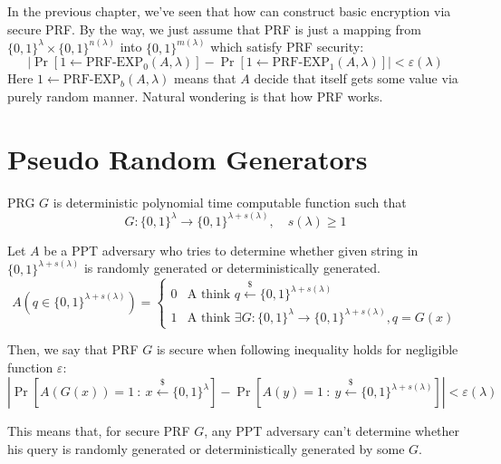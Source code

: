 \documentclass[12pt, a4paper, openany, twoside]{book}
\theoremstyle{definition}
\theoremstyle{remark}
\theoremstyle{plain}
\numberwithin{equation}{section}
\begin{document}
In the previous chapter, we've seen that how can construct basic encryption via secure PRF. 
By the way, we just assume that PRF is just a mapping from $\{0,1\}^\lambda \times \{0,1\}^{n(\lambda)}$ 
into $\{0,1\}^{m(\lambda)}$ which satisfy PRF security: 
\[\left|\Pr[1 \gets \text{PRF-EXP}_0(A, \lambda)] - \Pr[1 \gets \text{PRF-EXP}_1(A, \lambda)]\right| < \varepsilon(\lambda)\]
Here $1 \gets \text{PRF-EXP}_b(A, \lambda)$ means that $A$ decide that itself gets some value via purely random manner. 
Natural wondering is that how PRF works. 

\section{Pseudo Random Generators}

\begin{tcolorbox}[colback=yellow!10!white,colframe=brown!75!black,title=Pseudo Random Generator]

PRG $G$ is deterministic polynomial time computable function such that 
\[G: \{0, 1\}^{\lambda} \rightarrow \{0, 1\}^{\lambda + s(\lambda)}, \quad s(\lambda) \geq 1\]

\end{tcolorbox}

\begin{tcolorbox}[colback=yellow!10!white,colframe=blue!75!white,title=Secure PRG]

Let $A$ be a PPT adversary who tries to determine whether given string in $\{0,1\}^{\lambda + s(\lambda)}$ is 
randomly generated or deterministically generated. 
\[A(q \in \{0,1\}^{\lambda + s(\lambda)}) = \begin{cases}
    0 & \text{A think } q \xleftarrow{\$} \{0, 1\}^{\lambda + s(\lambda)} \\
    1 & \text{A think }\exists G: \{0,1\}^\lambda \rightarrow \{0, 1\}^{\lambda + s(\lambda)}, q = G(x)
\end{cases}\]

Then, we say that PRF $G$ is secure when following inequality holds for negligible function $\varepsilon$: 
\[\left|\Pr[A(G(x)) = 1 ~:~ x \xleftarrow{\$} \{0, 1\}^\lambda] - \Pr[A(y) = 1 ~:~ y \xleftarrow{\$} \{0,1\}^{\lambda + s(\lambda)}]\right| < \varepsilon(\lambda)\]

\end{tcolorbox}

This means that, for secure PRF $G$, any PPT adversary can't determine whether his query is 
randomly generated or deterministically generated by some $G$. 
\end{document}
